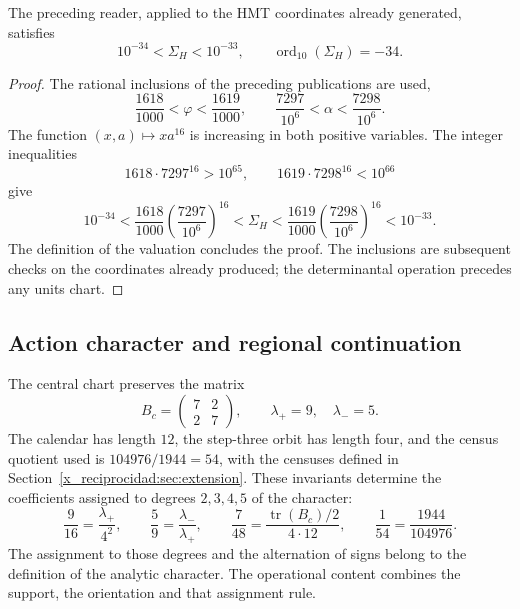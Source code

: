 \begin{theorem}
\label{x_reciprocidad:iv:action:decada}
The preceding reader, applied to the HMT coordinates already generated,
satisfies
\begin{equation}
 10^{-34}<\Sigma_H<10^{-33},
 \qquad \operatorname{ord}_{10}(\Sigma_H)=-34.
 \label{x_reciprocidad:iv:action:orden-decimal}
\end{equation}
\end{theorem}
\begin{proof}
The rational inclusions of the preceding
publications are used,
\begin{equation}
 \frac{1618}{1000}<\varphi<\frac{1619}{1000},
 \qquad
 \frac{7297}{10^6}<\alpha<\frac{7298}{10^6}.
 \label{x_reciprocidad:iv:action:intervalos}
\end{equation}
The function \((x,a)\mapsto xa^{16}\) is increasing in both
positive variables. The integer inequalities
\[
 1618\cdot7297^{16}>10^{65},
 \qquad 1619\cdot7298^{16}<10^{66}
\]
give
\[
 10^{-34}
 <\frac{1618}{1000}\left(\frac{7297}{10^6}\right)^{16}
 <\Sigma_H
 <\frac{1619}{1000}\left(\frac{7298}{10^6}\right)^{16}
 <10^{-33}.
\]
The definition of the valuation concludes the proof. The inclusions
are subsequent checks on the coordinates already produced; the
determinantal operation precedes any units chart.
\end{proof}

\subsection{Action character and regional continuation}
\label{x_reciprocidad:iv:action:caracter}

The central chart preserves the matrix
\[
 B_c=\begin{pmatrix}7&2\\2&7\end{pmatrix},
 \qquad\lambda_+=9,\quad\lambda_-=5.
\]
The calendar has length \(12\), the step-three orbit has length
four, and the census quotient used is
\(104976/1944=54\), with the censuses defined in
Section~\ref{x_reciprocidad:sec:extension}. These invariants determine the coefficients
assigned to degrees \(2,3,4,5\) of the character:
\begin{equation}
 \frac9{16}=\frac{\lambda_+}{4^2},\qquad
 \frac59=\frac{\lambda_-}{\lambda_+},\qquad
 \frac7{48}=\frac{\operatorname{tr}(B_c)/2}{4\cdot12},
 \qquad
 \frac1{54}=\frac{1944}{104976}.
 \label{x_reciprocidad:iv:action:coeficientes}
\end{equation}
The assignment to those degrees and the alternation of signs belong
to the definition of the analytic character. The operational content
combines the support, the orientation and that assignment rule.

